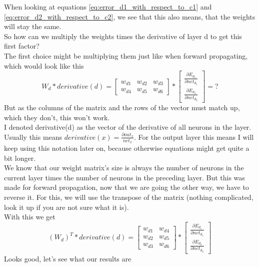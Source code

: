 \documentclass[11pt, halfparskip]{article}
\begin{document}
    \newpage \noindent
    When looking at equations \ref{eq:error_d1_with_respect_to_c1} and \ref{eq:error_d2_with_respect_to_c2}, we see that this also means, that the weights will stay the same.\\
    So how can we multiply the weights times the derivative of layer d to get this first factor?\\
    The first choice might be multiplying them just like when forward propagating, which would look like this
    \[
    	W_d * derivative(d) = 
    	\begin{bmatrix}
    		w_{d1} & w_{d2} & w_{d3}\\
            	w_{d4} & w_{d5} & w_{d6}
    	\end{bmatrix}
    	*
    	\begin{bmatrix}
    		\frac{\partial E_{d_1}}{\partial net_{d_1}}\\
    		\frac{\partial E_{d_2}}{\partial net_{d_2}}
    	\end{bmatrix}
    	= ?
    \]
    But as the columns of the matrix and the rows of the vector must match up, which they don't, this won't work.\\
    I denoted derivative(d) as the vector of the derivative of all neurons in the layer. Usually this means $derivative(x) = \frac{\partial out_x}{net_x}$. For the output layer this means 
    I will keep using this notation later on, because otherwise equations might get quite a bit longer.\\
    We know that our weight matrix's size is always the number of neurons in the current layer times the number of neurons in the preceding layer. But this was made for forward 
    propagation, now that we are going the other way, we have to reverse it. For this, we will use the transpose of the matrix (nothing complicated, look it up if you are not sure what it
    is).\\
    With this we get
    \[
    	(W_d)^T * derivative(d) = 
    	\begin{bmatrix}
    		w_{d1} & w_{d4}\\
            	w_{d2} & w_{d5}\\
            	w_{d3} & w_{d6}
    	\end{bmatrix}
    	*
    	\begin{bmatrix}
    		\frac{\partial E_{d_1}}{\partial net_{d_1}}\\
    		\frac{\partial E_{d_2}}{\partial net_{d_2}}
    	\end{bmatrix}
    \]
    Looks good, let's see what our results are
\end{document}
